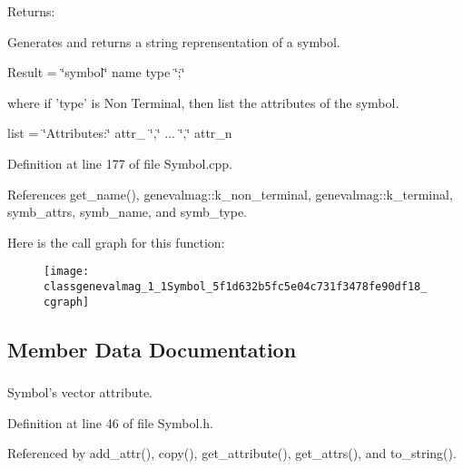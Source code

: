 \begin{Desc}
\item[Returns:]\end{Desc}
Generates and returns a string reprensentation of a symbol.

Result = \char`\"{}symbol\char`\"{} name type \char`\"{};\char`\"{}

where if 'type' is Non Terminal, then list the attributes of the symbol.

list = \char`\"{}Attributes:\char`\"{} attr\_ \char`\"{},\char`\"{} ... \char`\"{},\char`\"{} attr\_\-n 

Definition at line 177 of file Symbol.cpp.

References get\_\-name(), genevalmag::k\_\-non\_\-terminal, genevalmag::k\_\-terminal, symb\_\-attrs, symb\_\-name, and symb\_\-type.

Here is the call graph for this function:\nopagebreak
\begin{figure}[H]
\begin{center}
\leavevmode
\texttt{[image: classgenevalmag\_1\_1Symbol\_5f1d632b5fc5e04c731f3478fe90df18\_cgraph]}
\end{center}
\end{figure}


\subsection{Member Data Documentation}
\hypertarget{classgenevalmag_1_1Symbol_5085d920f7836a0b44993cc0e167e4c7}{
\subsubsection[{symb\_\-attrs}]{}}
\label{classgenevalmag_1_1Symbol_5085d920f7836a0b44993cc0e167e4c7}


Symbol's vector attribute. 



Definition at line 46 of file Symbol.h.

Referenced by add\_\-attr(), copy(), get\_\-attribute(), get\_\-attrs(), and to\_\-string().\hypertarget{classgenevalmag_1_1Symbol_ea1a4b2cd5d6ddd60a0f4c68989c11bd}{
\subsubsection[{symb\_\-id}]{}}
\label{classgenevalmag_1_1Symbol_ea1a4b2cd5d6ddd60a0f4c68989c11bd}


